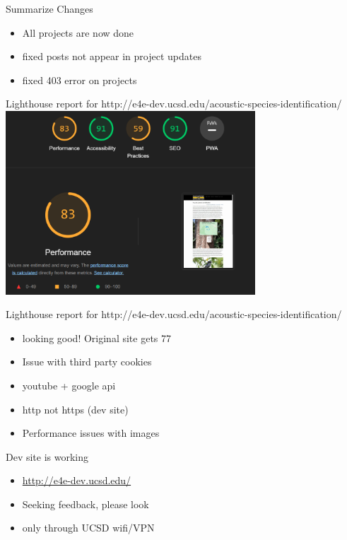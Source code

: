 

\begin{frame}{Summarize Changes}
    \begin{itemize}
        \item All projects are now done
        \item fixed posts not appear in project updates
        \item fixed 403 error on projects
    \end{itemize}
\end{frame}

\begin{frame}{Lighthouse report for http://e4e-dev.ucsd.edu/acoustic-species-identification/}
    \centering
    \includegraphics[height=0.7\textheight,width=0.7\textwidth,keepaspectratio]{./images/ligthouse.png}
\end{frame}

\begin{frame}{Lighthouse report for http://e4e-dev.ucsd.edu/acoustic-species-identification/}
    \begin{itemize}
        \item looking good! Original site gets 77
        \item Issue with third party cookies
        \item youtube + google api
        \item http not https (dev site)
        \item Performance issues with images
    \end{itemize}
\end{frame}

\begin{frame}{Dev site is working}
    \begin{itemize}
        \item  \href{http://e4e-dev.ucsd.edu/}{http://e4e-dev.ucsd.edu/}
        \item Seeking feedback, please look
        \item only through UCSD wifi/VPN
    \end{itemize}
\end{frame}



